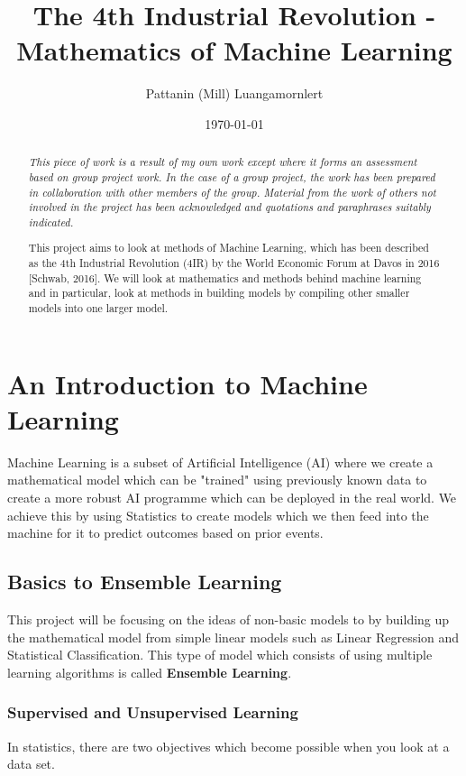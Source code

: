 \documentclass[11pt,a4paper]{report}
\title{The 4th Industrial Revolution - Mathematics of Machine Learning}
\author{Pattanin (Mill) Luangamornlert}
\date{\today}
\begin{document}
\maketitle

\begin{abstract}
    \emph{This piece of work is a result of my own work except where it forms an assessment based on group project work. In the case of a group project, the work has been prepared in collaboration with other members of the group. Material from the work of others not involved in the project has been acknowledged and quotations and paraphrases suitably indicated.}
    
    \bigskip
    \bigskip
    
    This project aims to look at methods of Machine Learning, which has been described as the 4th Industrial Revolution (4IR) by the World Economic Forum at Davos in 2016 [Schwab, 2016].
    We will look at mathematics and methods behind machine learning and in particular, look at methods in building models by compiling other smaller models into one larger model.
    
    
    
\end{abstract}

\tableofcontents

\chapter{An Introduction to Machine Learning}
Machine Learning is a subset of Artificial Intelligence (AI) where we create a mathematical model which can be "trained" using previously known data to create a more robust AI programme which can be deployed in the real world.
We achieve this by using Statistics to create models which we then feed into the machine for it to predict outcomes based on prior events.
\section{Basics to Ensemble Learning}
This project will be focusing on the ideas of non-basic models to by building up the mathematical model from simple linear models such as Linear Regression and Statistical Classification. This type of model which consists of using multiple learning algorithms is called \textbf{Ensemble Learning}.

\subsection{Supervised and Unsupervised Learning}
In statistics, there are two objectives which become possible when you look at a data set.
\end{document}
